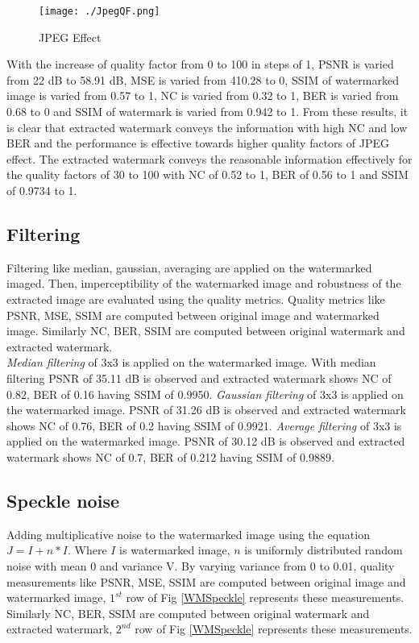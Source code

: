 \begin{figure*}
\centering
\texttt{[image: ./JpegQF.png]}
\caption{JPEG Effect}
\label{WMJPeg}
\end{figure*}

With the increase of quality factor from 0 to 100 in steps of 1, PSNR is varied from 22 dB to 58.91 dB, MSE is varied from 410.28 to 0, SSIM of watermarked image is varied from 0.57 to 1, NC is varied from 0.32 to 1, BER is varied from 0.68 to 0 and SSIM of watermark is varied from 0.942 to 1. From these results, it is clear that extracted watermark conveys the information with high NC and low BER and the performance is effective towards higher quality factors of JPEG effect. The extracted watermark conveys the reasonable information effectively for the quality factors of 30 to 100 with NC of 0.52 to 1, BER of 0.56 to 1 and SSIM of 0.9734 to 1.


\subsection{Filtering}

Filtering like median, gaussian, averaging are applied on the watermarked imaged. Then, imperceptibility of the watermarked image and robustness of the extracted image are evaluated using the quality metrics. Quality metrics like PSNR, MSE, SSIM are computed between original image and watermarked image. Similarly NC, BER, SSIM are computed between original watermark and extracted watermark.\\
\textit {Median filtering} of $3$x$3$ is applied on the watermarked image. With median filtering PSNR of 35.11 dB is observed and extracted watermark shows NC of 0.82, BER of 0.16 having SSIM of 0.9950.
\textit {Gaussian filtering} of $3$x$3$ is applied on the watermarked image. PSNR of 31.26 dB is observed and extracted watermark shows NC of 0.76, BER of 0.2 having SSIM of 0.9921. 
\textit {Average filtering} of $3$x$3$ is applied on the watermarked image. PSNR of 30.12 dB is observed and extracted watermark shows NC of 0.7, BER of 0.212 having SSIM of 0.9889. 

 \subsection{Speckle noise}   
    Adding multiplicative noise to the watermarked image using the equation $J= I + n*I$. Where $I$ is watermarked image, $n$ is uniformly distributed random noise with mean 0 and variance V. By varying variance from 0 to 0.01, quality measurements like PSNR, MSE, SSIM are computed between original image and watermarked image, $1^{st}$ row of Fig \ref{WMSpeckle} represents these measurements. Similarly NC, BER, SSIM are computed between original watermark and extracted watermark, $2^{nd}$ row of Fig \ref{WMSpeckle} represents these measurements.\\
    
